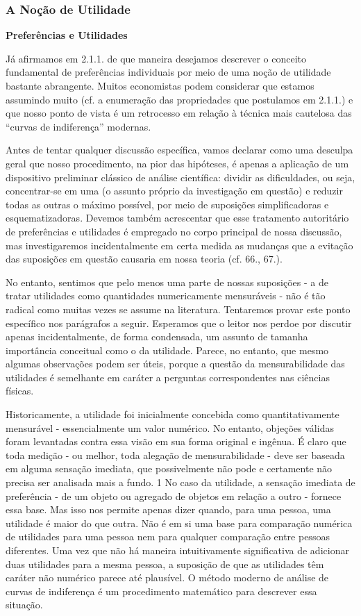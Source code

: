 \documentclass[a4paper,12pt]{article}[abntex2]
\begin{document}
\subsubsection{\textbf{A Noção de Utilidade}}
\textbf{Preferências e Utilidades}

Já afirmamos em 2.1.1. de que maneira desejamos descrever o conceito fundamental de preferências individuais por meio de uma noção de utilidade bastante abrangente. Muitos economistas podem considerar que estamos assumindo muito (cf. a enumeração das propriedades que postulamos em 2.1.1.) e que nosso ponto de vista é um retrocesso em relação à técnica mais cautelosa das “curvas de indiferença” modernas.

Antes de tentar qualquer discussão específica, vamos declarar como uma desculpa geral que nosso procedimento, na pior das hipóteses, é apenas a aplicação de um dispositivo preliminar clássico de análise científica: dividir as dificuldades, ou seja, concentrar-se em uma (o assunto próprio da investigação em questão) e reduzir todas as outras o máximo possível, por meio de suposições simplificadoras e esquematizadoras. Devemos também acrescentar que esse tratamento autoritário de preferências e utilidades é empregado no corpo principal de nossa discussão, mas investigaremos incidentalmente em certa medida as mudanças que a evitação das suposições em questão causaria em nossa teoria (cf. 66., 67.).

No entanto, sentimos que pelo menos uma parte de nossas suposições - a de tratar utilidades como quantidades numericamente mensuráveis - não é tão radical como muitas vezes se assume na literatura. Tentaremos provar este ponto específico nos parágrafos a seguir. Esperamos que o leitor nos perdoe por discutir apenas incidentalmente, de forma condensada, um assunto de tamanha importância conceitual como o da utilidade. Parece, no entanto, que mesmo algumas observações podem ser úteis, porque a questão da mensurabilidade das utilidades é semelhante em caráter a perguntas correspondentes nas ciências físicas.

Historicamente, a utilidade foi inicialmente concebida como quantitativamente mensurável - essencialmente um valor numérico. No entanto, objeções válidas foram levantadas contra essa visão em sua forma original e ingênua. É claro que toda medição - ou melhor, toda alegação de mensurabilidade - deve ser baseada em alguma sensação imediata, que possivelmente não pode e certamente não precisa ser analisada mais a fundo. 1 No caso da utilidade, a sensação imediata de preferência - de um objeto ou agregado de objetos em relação a outro - fornece essa base. Mas isso nos permite apenas dizer quando, para uma pessoa, uma utilidade é maior do que outra. Não é em si uma base para comparação numérica de utilidades para uma pessoa nem para qualquer comparação entre pessoas diferentes. Uma vez que não há maneira intuitivamente significativa de adicionar duas utilidades para a mesma pessoa, a suposição de que as utilidades têm caráter não numérico parece até plausível. O método moderno de análise de curvas de indiferença é um procedimento matemático para descrever essa situação.
\end{document}

